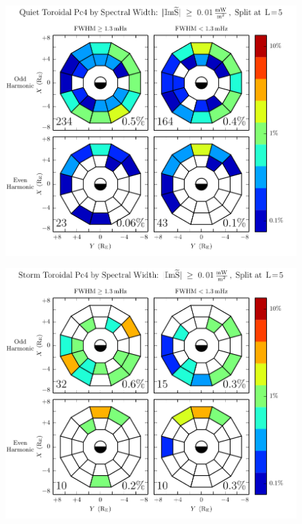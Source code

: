 \begin{figure}[!htb]
    \centering
    \includegraphics[width=\textwidth]{figures/fwhm_rate_t_calm.pdf}
    \caption[Toroidal Pc4 Rate by Spectral Width: Dst$\geq \SI{-30}{\nT}$]{
      \todo{$\cdots$}
    }
    \label{fig_fwhm_rate_t_calm}
\end{figure}

\begin{figure}[!htb]
    \centering
    \includegraphics[width=\textwidth]{figures/fwhm_rate_t_storm.pdf}
    \caption[Toroidal Pc4 Rate by Spectral Width: Dst$< \SI{-30}{\nT}$]{
      \todo{$\cdots$}
    }
    \label{fig_fwhm_rate_t_storm}
\end{figure}

